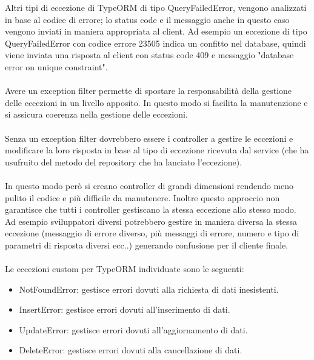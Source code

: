 Altri tipi di eccezione di TypeORM di tipo QueryFailedError, vengono analizzati in base al codice di errore; 
lo status code e il messaggio anche in questo caso vengono inviati in maniera appropriata al client.
Ad esempio un eccezione di tipo QueryFailedError con codice errore 23505 indica un confitto nel database, quindi
viene inviata una risposta al client con status code 409 e messaggio "database error on unique constraint".
\\\\
Avere un exception filter permette di spostare la responsabilità della gestione delle eccezioni in un livello
apposito. In questo modo si facilita la manutenzione e si assicura coerenza nella gestione delle eccezioni.
\\\\
Senza un exception filter dovrebbero essere i controller a gestire le eccezioni e modificare la loro risposta
in base al tipo di eccezione ricevuta dal service (che ha usufruito del metodo del repository che ha lanciato
l'eccezione).
\\\\
In questo modo però si creano controller di grandi dimensioni rendendo meno pulito il codice e più difficile
da manutenere. Inoltre questo approccio non garantisce che tutti i controller gestiscano la stessa eccezione
allo stesso modo. 
\\
Ad esempio sviluppatori diversi potrebbero gestire in maniera diversa la stessa eccezione (messaggio di errore diverso,
più messaggi di errore, numero e tipo di parametri di risposta diversi ecc..)
generando confusione per il cliente finale.
\\\\
Le eccezioni custom per TypeORM individuate sono le seguenti:
\begin{itemize}
    \item NotFoundError: gestisce errori dovuti alla richiesta di dati inesistenti.
    \item InsertError: gestisce errori dovuti all'inserimento di dati.
    \item UpdateError: gestisce errori dovuti all'aggiornamento di dati.
    \item DeleteError: gestisce errori dovuti alla cancellazione di dati.
\end{itemize}
\leavevmode\newline

